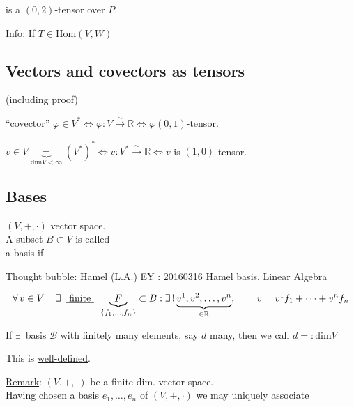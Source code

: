 is a $(0,2)$-tensor over $P$.  

\underline{Info}: If $T \in \text{Hom}(V,W)$

\subsection{Vectors and covectors as tensors}

\begin{theorem} (including proof)
	
	``covector''  $\varphi \in V^* \Longleftrightarrow \varphi : V \xrightarrow{ \sim } \mathbb{R} \Longleftrightarrow \varphi (0,1)$-tensor.  
\end{theorem}

\begin{theorem}
	$v\in V \underbrace{=}_{\text{dim}V<\infty} (V^*)^* \Longleftrightarrow v: V^* \xrightarrow{ \sim} \mathbb{R} \Longleftrightarrow v $ is $(1,0)$-tensor.  
\end{theorem}

\subsection{Bases}

\begin{definition}
	$(V,+,\cdot)$ vector space. \\
	A subset $B\subset V$ is called \\
	a basis if 
	
	Thought bubble: Hamel (L.A.) EY : 20160316 Hamel basis, Linear Algebra
	
	\[
	\forall \, v \in V \quad \, \exists \, \text{ \underline{ finite } } \, \underbrace{F}_{ \lbrace f_1 , \dots , f_n \rbrace }  \subset B : \exists \, ! \underbrace{ v^1, v^2 , \dots , v^n }_{ \in \mathbb{R} },  \qquad \, v = v^1 f_1 + \dots + v^n f_n 
	\]
\end{definition}

\begin{definition}
	If $\exists \, $ basis $\mathcal{B}$ with finitely many elements, say $d$ many, then we call $d =:\text{dim}{V}$
	
	This is \underline{well-defined}.
\end{definition}

\underline{Remark}: $(V,+,\cdot)$ be a finite-dim. vector space.   \\
Having chosen a basis $e_1, \dots, e_n$ of $(V,+,\cdot)$ we may uniquely associate

